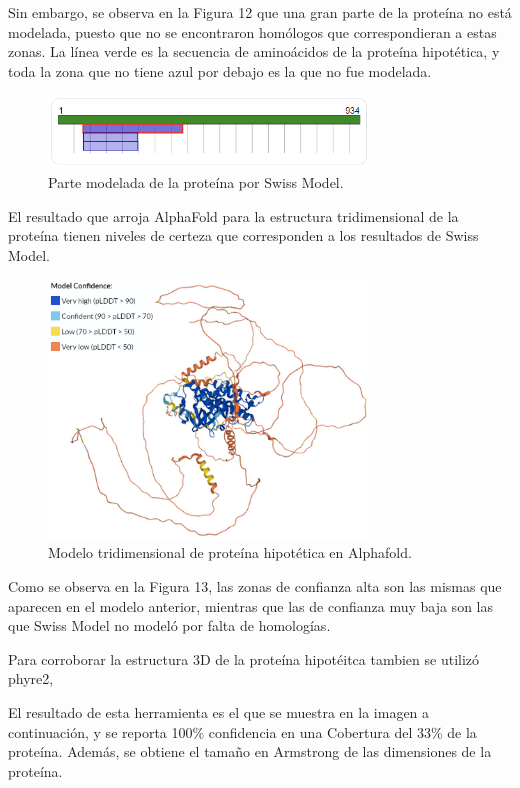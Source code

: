 \documentclass[journal,transmag]{IEEEtran}
\begin{document}
Sin embargo, se observa en la Figura 12 que una gran parte de la proteína no está modelada, puesto que no se encontraron homólogos que correspondieran a estas zonas. La línea verde es la secuencia de aminoácidos de la proteína hipotética, y toda la zona que no tiene azul por debajo es la que no fue modelada.  

\begin{figure}[!h]
	\center
	\includegraphics[width=8.5cm]{imagenes/alpha1.png}
	\caption{Parte modelada de la proteína por Swiss Model.}
	\label{13}
\end{figure}

El resultado que arroja AlphaFold para la estructura tridimensional de la proteína tienen niveles de certeza que corresponden a los resultados de Swiss Model.  


\begin{figure}[!h]
	\center
	\includegraphics[width=8.5cm]{imagenes/alpha2.png}
	\caption{Modelo tridimensional de proteína hipotética en Alphafold.}
	\label{14}
\end{figure}

Como se observa en la Figura 13, las zonas de confianza alta son las mismas que aparecen en el modelo anterior, mientras que las de confianza muy baja son las que Swiss Model no modeló por falta de homologías.  

Para corroborar la estructura 3D de la proteína hipotéitca tambien se utilizó phyre2, 

El resultado de esta herramienta es el que se muestra en la imagen a continuación, y se reporta 100\% confidencia en una Cobertura del 33\% de la proteína. Además, se obtiene el tamaño en Armstrong de las dimensiones de la proteína.
\end{document}
